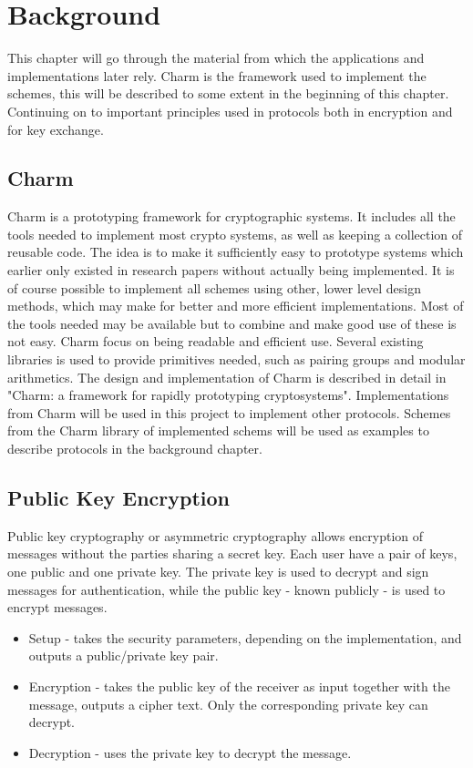 \chapter{Background}
\label{chp:background} 
This chapter will go through the material from which the applications and implementations later rely. Charm is the framework used to implement the schemes, this will be described to some extent in the beginning of this chapter. Continuing on to important principles used in protocols both in encryption and for key exchange.

\section{Charm}
Charm\cite{DBLP:Charm13} is a prototyping framework for cryptographic systems. It includes all the tools needed to implement most crypto systems, as well as keeping a collection of reusable code. The idea is to make it sufficiently easy to prototype systems which earlier only existed in research papers without actually being implemented. It is of course possible to implement all schemes using other, lower level design methods, which may make for better and more efficient implementations. Most of the tools needed may be available but to combine and make good use of these is not easy. Charm focus on being readable and efficient use. Several existing libraries is used to provide primitives needed, such as pairing groups and modular arithmetics. The design and implementation of Charm is described in detail in "Charm: a framework for rapidly prototyping cryptosystems"\cite{DBLP:Charm13}. Implementations from Charm will be used in this project to implement other protocols. Schemes from the Charm library of implemented schems will be used as examples to describe protocols in the background chapter.

\section{Public Key Encryption}\label{sec:pke}
Public key cryptography or asymmetric cryptography allows encryption of messages without the parties sharing a secret key. Each user have a pair of keys, one public and one private key. The private key is used to decrypt and sign messages for authentication, while the public key - known publicly - is used to encrypt messages. 
\begin{itemize}
\item Setup - takes the security parameters, depending on the implementation, and outputs a public/private key pair.
\item Encryption - takes the public key of the receiver as input together with the message, outputs a cipher text. Only the corresponding private key can decrypt.
\item Decryption - uses the private key to decrypt the message.
\end{itemize}

